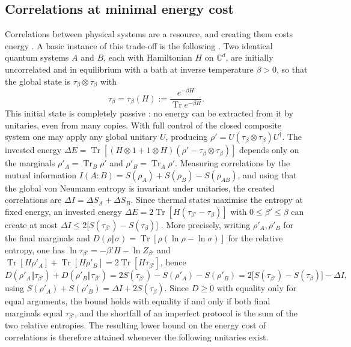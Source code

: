 \documentclass[11pt]{amsart}
\theoremstyle{definition}
\theoremstyle{remark}
\numberwithin{equation}{section}
\newcommand{\C}{\mathbb{C}}
\newcommand{\Tr}{\operatorname{Tr}}
\begin{document}
\subsection{Correlations at minimal energy cost}
Correlations between physical systems are a resource, and creating them costs energy
\cite{HuberEtAl2015,BruschiEtAl2015,VitaglianoEtAl2019}. A basic instance of this trade-off is the
following \cite{BakhshinezhadEtAl2019}. Two identical quantum systems $A$ and $B$, each with
Hamiltonian $H$ on $\C^d$, are initially uncorrelated and in equilibrium with a bath at inverse
temperature $\beta>0$, so that the global state is $\tau_\beta\otimes\tau_\beta$ with
\[
  \tau_\beta=\tau_\beta(H):=\frac{e^{-\beta H}}{\Tr e^{-\beta H}} .
\]
This initial state is completely passive \cite{PuszWoronowicz1978}: no energy can be extracted from it
by unitaries, even from many copies.
With full control of the closed composite system one may apply any global unitary $U$, producing
$\rho'=U(\tau_\beta\otimes\tau_\beta)U^\dagger$. The invested energy
$\Delta E=\Tr[(H\otimes 1+1\otimes H)(\rho'-\tau_\beta\otimes\tau_\beta)]$ depends only on the
marginals $\rho'_A=\Tr_B\rho'$ and $\rho'_B=\Tr_A\rho'$. Measuring correlations by the mutual
information $I(A{:}B)=S(\rho_A)+S(\rho_B)-S(\rho_{AB})$, and using that the global von Neumann
entropy is invariant under unitaries, the created correlations are $\Delta I=\Delta S_A+\Delta S_B$.
Since thermal states maximise the entropy at fixed energy, an invested energy
$\Delta E=2\Tr[H(\tau_{\beta'}-\tau_\beta)]$ with $0\le\beta'\le\beta$ can create at most
$\Delta I\le2\bigl[S(\tau_{\beta'})-S(\tau_\beta)\bigr]$ \cite{HuberEtAl2015}
\cite[Sec.~II and App.~A.I]{BakhshinezhadEtAl2019}. More precisely, writing $\rho'_A,\rho'_B$ for the final
marginals and $D(\rho\Vert\sigma)=\Tr[\rho(\ln\rho-\ln\sigma)]$ for the relative entropy, one has
$\ln\tau_{\beta'}=-\beta'H-\ln Z_{\beta'}$ and $\Tr[H\rho'_A]+\Tr[H\rho'_B]=2\Tr[H\tau_{\beta'}]$, hence
\[
  D(\rho'_A\Vert\tau_{\beta'})+D(\rho'_B\Vert\tau_{\beta'})
  =2S(\tau_{\beta'})-S(\rho'_A)-S(\rho'_B)
  =2\bigl[S(\tau_{\beta'})-S(\tau_\beta)\bigr]-\Delta I ,
\]
using $S(\rho'_A)+S(\rho'_B)=\Delta I+2S(\tau_\beta)$. Since $D\ge0$ with equality only for equal
arguments, the bound holds with equality if and only if both final marginals equal $\tau_{\beta'}$, and
the shortfall of an imperfect protocol is the sum of the two relative entropies.
The resulting lower bound on the energy cost of correlations is therefore attained whenever the
following unitaries exist.
\end{document}
